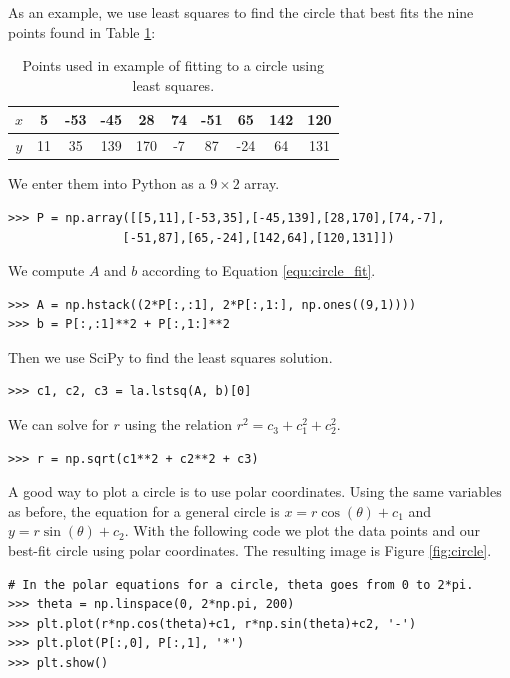 As an example, we use least squares to find the circle that best fits the nine points found in Table \ref{table:circlepts}:

\begin{table}[H]
\begin{tabular}{c||c|c|c|c|c|c|c|c|c}
$x$& 5  &-53 & -45 &  28 & 74 & -51 &  65 & 142 & 120 \\ \hline
$y$& 11 & 35 & 139 & 170 & -7 &  87 & -24 &  64 & 131 \\
\end{tabular}
\caption{Points used in example of fitting to a circle using least squares.}
\label{table:circlepts}
\end{table}

We enter them into Python as a $9\times 2$ array.

\begin{lstlisting}
>>> P = np.array([[5,11],[-53,35],[-45,139],[28,170],[74,-7],
                [-51,87],[65,-24],[142,64],[120,131]])
\end{lstlisting}

We compute $A$ and $b$ according to Equation \ref{equ:circle_fit}.

\begin{lstlisting}
>>> A = np.hstack((2*P[:,:1], 2*P[:,1:], np.ones((9,1))))
>>> b = P[:,:1]**2 + P[:,1:]**2
\end{lstlisting}

Then we use SciPy to find the least squares solution.

\begin{lstlisting}
>>> c1, c2, c3 = la.lstsq(A, b)[0]
\end{lstlisting}

We can solve for $r$ using the relation $r^2 = c_3+c_1^2+c_2^2$.

\begin{lstlisting}
>>> r = np.sqrt(c1**2 + c2**2 + c3)
\end{lstlisting}

A good way to plot a circle is to use polar coordinates.
Using the same variables as before, the equation for a general circle is $x=r\cos(\theta)+c_1$ and $y=r\sin(\theta)+c_2$.
With the following code we plot the data points and our best-fit circle using polar coordinates.
The resulting image is Figure \ref{fig:circle}.

\begin{lstlisting}
# In the polar equations for a circle, theta goes from 0 to 2*pi.
>>> theta = np.linspace(0, 2*np.pi, 200)
>>> plt.plot(r*np.cos(theta)+c1, r*np.sin(theta)+c2, '-')
>>> plt.plot(P[:,0], P[:,1], '*')
>>> plt.show()
\end{lstlisting}

